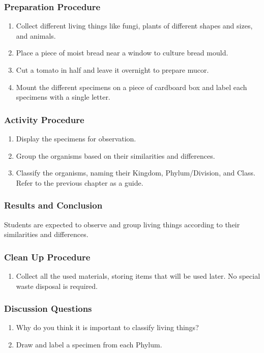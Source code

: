 \subsubsection*{Preparation Procedure}
\begin{enumerate}
\item{Collect different living things like fungi, plants of different shapes and sizes, and animals.}
\item{ Place a piece of moist bread near a window to culture bread mould.}
\item{ Cut a tomato in half and leave it overnight to prepare mucor.}
\item{Mount the different specimens on a piece of cardboard box and label each specimens with a single letter.}
\end{enumerate}

\subsubsection*{Activity Procedure}
\begin{enumerate}
\item{Display the specimens for observation.}
\item{Group the organisms based on their similarities and differences.}
\item{Classify the organisms, naming their Kingdom, Phylum/Division, and Class. Refer to the previous chapter as a guide.}
\end{enumerate}

\subsubsection*{Results and Conclusion}
Students are expected to observe and group living things according to their similarities and differences.

\subsubsection*{Clean Up Procedure}
\begin{enumerate}
\item{Collect all the used materials, storing items that will be used later. No special waste disposal is required.}
\end{enumerate}

\subsubsection*{Discussion Questions}
\begin{enumerate}
\item{Why do you think it is important to classify living things?}
\item{Draw and label a specimen from each Phylum.}
\end{enumerate}


